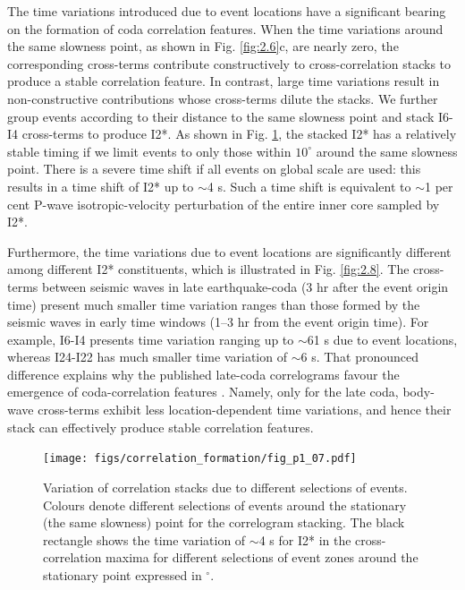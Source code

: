 The time variations introduced due to event locations have a significant bearing on the formation of coda correlation features. When the time variations around the same slowness point, as shown in Fig. \ref{fig:2.6}c, are nearly zero, the corresponding cross-terms contribute constructively to cross-correlation stacks to produce a stable correlation feature. In contrast, large time variations result in non-constructive contributions whose cross-terms dilute the stacks. We further group events according to their distance to the same slowness point and stack I6-I4 cross-terms to produce I2*. As shown in Fig. \ref{fig:2.7}, the stacked I2* has a relatively stable timing if we limit events to only those within $10^{\circ}$ around the same slowness point. There is a severe time shift if all events on global scale are used: this results in a time shift of I2* up to $\sim$4 s. Such a time shift is equivalent to $\sim$1 per cent P-wave isotropic-velocity perturbation of the entire inner core sampled by I2*.



Furthermore, the time variations due to event locations are significantly different among different I2* constituents, which is illustrated in Fig. \ref{fig:2.8}. The cross-terms between seismic waves in late earthquake-coda (3 hr after the event origin time) present much smaller time variation ranges than those formed by the seismic waves in early time windows (1--3 hr from the event origin time). For example, I6-I4 presents time variation ranging up to $\sim$61 s due to event locations, whereas I24-I22 has much smaller time variation of $\sim$6 s. That pronounced difference explains why the published late-coda correlograms favour the emergence of coda-correlation features  \citep[e.g.,][]{lin_seismic_2013,poli_analysis_2017}. Namely, only for the late coda, body-wave cross-terms exhibit less location-dependent time variations, and hence their stack can effectively produce stable correlation features.

\begin{figure}[!hbt]
	\centering
	\texttt{[image: figs/correlation\_formation/fig\_p1\_07.pdf]}
	\caption[Variation of the I2* due to different selections of events]
    {
		Variation of correlation stacks due to different selections of events. Colours denote different selections of events around the stationary (the same slowness) point for the correlogram stacking. The black rectangle shows the time variation of $\sim$4 s for I2* in the cross-correlation maxima for different selections of event zones around the stationary point expressed in $^{\circ}$.
	}
	\label{fig:2.7}
\end{figure}


